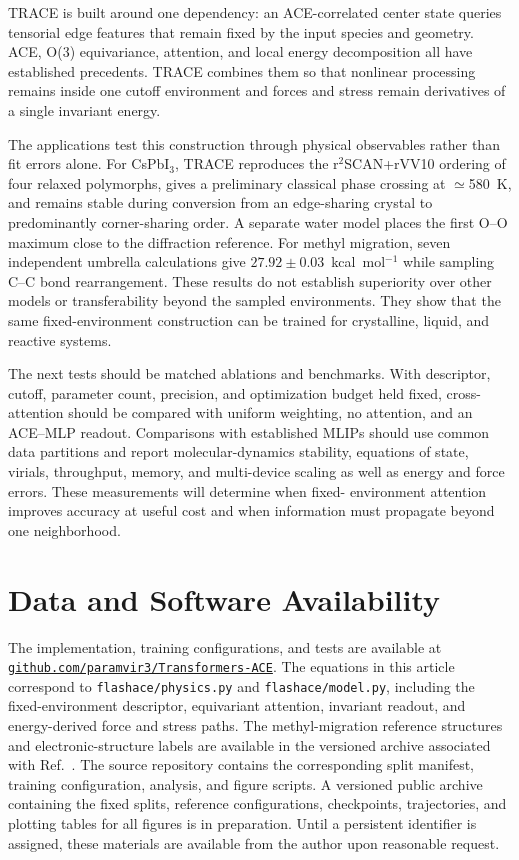 \documentclass[aps,prx,preprint,notitlepage,superscriptaddress,nofootinbib,floatfix]{revtex4-2}
\begin{document}
TRACE is built around one dependency: an ACE-correlated
center state queries tensorial edge features that remain fixed by the input
species and geometry. ACE, O(3) equivariance, attention, and local energy
decomposition all have established precedents. TRACE combines them so that
nonlinear processing remains inside one cutoff environment and forces and
stress remain derivatives of a single invariant energy.

The applications test this construction through physical
observables rather than fit errors alone. For CsPbI$_3$, TRACE reproduces the
r$^2$SCAN+rVV10 ordering of four relaxed polymorphs, gives a preliminary
classical phase crossing at $\simeq$580~K, and remains stable during conversion from an edge-sharing crystal to predominantly corner-sharing order. A separate water
model places the first O--O maximum close to the diffraction reference. For
methyl migration, seven independent umbrella calculations give
$27.92\pm0.03$~kcal~mol$^{-1}$ while sampling C--C bond rearrangement. These
results do not establish superiority over other models or transferability
beyond the sampled environments. They show that the same fixed-environment
construction can be trained for crystalline, liquid, and reactive systems.

The next tests should be matched ablations and benchmarks.
With descriptor, cutoff, parameter count, precision, and optimization budget
held fixed, cross-attention should be compared with uniform weighting, no
attention, and an ACE--MLP readout. Comparisons with established MLIPs should
use common data partitions and report molecular-dynamics stability, equations
of state, virials, throughput, memory, and multi-device scaling as well as
energy and force errors. These measurements will determine when fixed-
environment attention improves accuracy at useful cost and when information
must propagate beyond one neighborhood.

\section*{Data and Software Availability}

The implementation, training configurations, and tests are
available at \href{https://github.com/paramvir3/Transformers-ACE}{\nolinkurl{github.com/paramvir3/Transformers-ACE}}. The equations in this article correspond to \nolinkurl{flashace/physics.py} and \nolinkurl{flashace/model.py}, including the fixed-environment descriptor, equivariant attention, invariant readout, and energy-derived force and stress paths. The methyl-migration reference structures and electronic-structure labels are available in the versioned archive associated with Ref.~\cite{vitartas2026}. The source repository contains the corresponding split manifest, training configuration, analysis, and figure scripts. A versioned public archive containing the fixed splits, reference configurations, checkpoints, trajectories, and plotting tables for all figures is in preparation. Until a persistent identifier is assigned, these materials are available from the author upon reasonable request.
\end{document}
